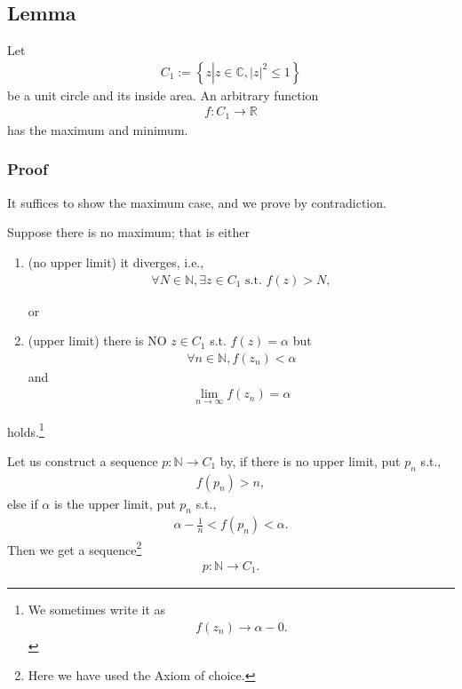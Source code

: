 \documentclass[11pt]{book}
\begin{document}
\subsection{Lemma}
\label{aLemmaForFundamentalTheoremInAlgebra}
Let
\begin{eqnarray}
C_1 := \left\{z \left| z \in \mathbb{C}, |z|^2 \leq 1 \right.\right\}
\end{eqnarray}
be a unit circle and its inside area.
An arbitrary function
\begin{eqnarray}
f: C_1 \to \mathbb{R}
\end{eqnarray}
has the maximum and minimum.

\subsubsection{Proof}
It suffices to show the maximum case, and we prove by contradiction.

Suppose there is no maximum; that is either
\begin{enumerate}

\item (no upper limit)
\label{noUpperLimit}
it diverges, i.e.,
\begin{eqnarray}
\forall N \in \mathbb{N}, \exists z \in C_1 \text{ s.t. } f(z) > N,
\end{eqnarray}

or

\item (upper limit)
\label{upperLimit}
there is NO $z \in C_1$ s.t. $f(z) = \alpha$ but
\begin{eqnarray}
\forall n \in \mathbb{N}, f(z_n) < \alpha
\end{eqnarray}
and
\begin{eqnarray}
\lim_{n \to \infty} f(z_n) = \alpha
\end{eqnarray}

\end{enumerate}
holds.\footnote{
We sometimes write it as
\begin{eqnarray}
f(z_n) \to \alpha - 0.
\end{eqnarray}
}

Let us construct a sequence $p: \mathbb{N} \to C_1$ by, if there is no upper limit, put $p_n$ s.t.,
\begin{eqnarray}
f(p_n) > n,
\end{eqnarray}
else if $\alpha$ is the upper limit, put $p_n$ s.t.,
\begin{eqnarray}
\alpha - \frac{1}{n} < f(p_n) < \alpha.
\end{eqnarray}
Then we get a sequence\footnote{Here we have used the Axiom of choice.}
\begin{eqnarray}
p: \mathbb{N} \to C_1.
\end{eqnarray}
\end{document}
